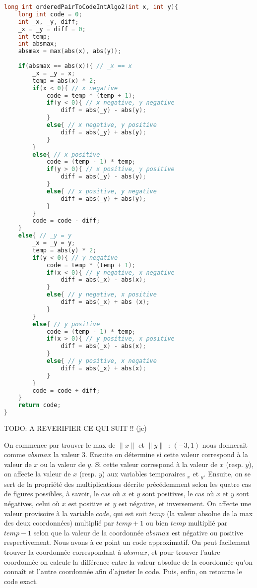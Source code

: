\documentclass{article}
\begin{document}
\begin{lstlisting}[language=C]
long int orderedPairToCodeIntAlgo2(int x, int y){
	long int code = 0;
	int _x, _y, diff;
	_x = _y = diff = 0;
	int temp;
	int absmax;	
	absmax = max(abs(x), abs(y));	
	
	if(absmax == abs(x)){ // _x == x 
		_x = _y = x;
		temp = abs(x) * 2;
		if(x < 0){ // x negative
			code = temp * (temp + 1);
			if(y < 0){ // x negative, y negative
				diff = abs(_y) - abs(y);
			}
			else{ // x negative, y positive
				diff = abs(_y) + abs(y);
			}
		}
		else{ // x positive
			code = (temp - 1) * temp; 
			if(y > 0){ // x positive, y positive
				diff = abs(_y) - abs(y);
			}
			else{ // x positive, y negative
				diff = abs(_y) + abs(y);
			}
		}
		code = code - diff;
	}
	else{ // _y = y
		_x = _y = y;
		temp = abs(y) * 2;
		if(y < 0){ // y negative
			code = temp * (temp + 1);		
			if(x < 0){ // y negative, x negative
				diff = abs(_x) - abs(x);
			}
			else{ // y negative, x positive
				diff = abs(_x) + abs (x);
			}
		}
		else{ // y positive
			code = (temp - 1) * temp;
			if(x > 0){ // y positive, x positive
				diff = abs(_x) - abs(x);
			}
			else{ // y positive, x negative
				diff = abs(_x) + abs(x);
			}	
		}	
		code = code + diff;	
	}
	return code;
}
\end{lstlisting}

TODO: A REVERIFIER CE QUI SUIT !! (jc)

On commence par trouver le max de $\|x\|$ et $\|y\|$~: $(-3,1)$ nous donnerait comme $absmax$ la valeur $3$. Ensuite on détermine si cette valeur correspond à la valeur de $x$ ou la valeur de $y$. Si cette valeur correspond à la valeur de $x$ (resp. $y$), on affecte la valeur de $x$ (resp. $y$) aux variables temporaires $_x$ et $_y$. Ensuite, on se sert de la propriété des multiplications décrite précédemment selon les quatre cas de figures possibles, à savoir, le cas où $x$ et $y$ sont positives, le cas où $x$ et $y$ sont négatives, celui où $x$ est positive et $y$ est négative, et inversement. On affecte une valeur provisoire à la variable $code$, qui est soit $temp$ (la valeur absolue de la max des deux coordonnées) multiplié par $temp + 1$ ou bien $temp$ multiplié par $temp - 1$ selon que la valeur de la coordonnée $absmax$ est négative ou positive respectivement. Nous avons à ce point un code approximatif. On peut facilement trouver la coordonnée correspondant à $absmax$, et pour trouver l'autre coordonnée on calcule la différence entre la valeur absolue de la coordonnée qu'on connaît et l'autre coordonnée afin d'ajuster le code. Puis, enfin, on retourne le code exact.
\end{document}
